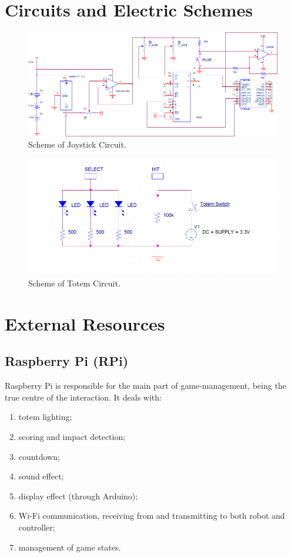 \documentclass[a4paper,twoside]{book}
\begin{document}
\begin{appendices}

\chapter{Circuits and Electric Schemes}
\label{app:circuit}

\begin{figure}[h]
\includegraphics[width=\linewidth]{img/ControllerCircuitry} 
\caption{Scheme of Joystick Circuit.}
\end{figure}

\begin{figure}[h]
\includegraphics[width=\linewidth]{img/Totem} 
\caption{Scheme of Totem Circuit.}
\end{figure}

\chapter{External Resources}
\label{app:external}

\section{Raspberry Pi (RPi)}
\label{app:RPi}
\beforelist* Raspberry Pi is responsible for the main part of game-management, being the true centre of the interaction. It deals with:
\begin{enumerate}
\item totem lighting;
\item scoring and impact detection;
\item countdown;
\item sound effect;
\item display effect (through Arduino);
\item Wi-Fi communication, receiving from and transmitting to both robot and controller;
\item management of game states.
\end {enumerate}


\end{appendices}
\end{document}
